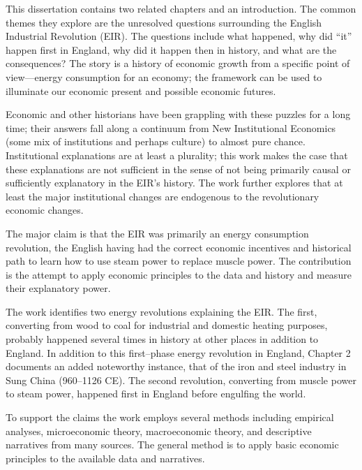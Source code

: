 
\setcounter{page}{3}


	This dissertation contains two related chapters and an introduction. The common themes they explore are the unresolved questions surrounding the English Industrial Revolution (EIR). The questions include what happened, why did ``it'' happen first in England, why did it happen then in history, and what are the consequences? The story is a history of economic growth from a specific point of view---energy consumption for an economy; the framework can be used to illuminate our economic present and possible economic futures.

	Economic and other historians have been grappling with these puzzles for a long time; their answers fall along a continuum from New Institutional Economics (some mix of institutions and perhaps culture) to almost pure chance. Institutional explanations are at least a plurality; this work makes the case that these explanations are not sufficient in the sense of not being primarily causal or sufficiently explanatory in the EIR's history. The work further explores that at least the major institutional changes are endogenous to the revolutionary economic changes.

	The major claim is that the EIR was primarily an energy consumption revolution, the English having had the correct economic incentives and historical path to learn how to use steam power to replace muscle power. The contribution is the attempt to apply economic principles to the data and history and measure their explanatory power.

	The work identifies two energy revolutions explaining the EIR. The first, converting from wood to coal for industrial and domestic heating purposes, probably happened several times in history at other places in addition to England. In addition to this first--phase energy revolution in England, Chapter 2 documents an added noteworthy instance, that of the iron and steel industry in Sung China (960--1126 CE). The second revolution, converting from muscle power to steam power, happened first in England before engulfing the world.

	To support the claims the work employs several methods including empirical analyses, microeconomic theory, macroeconomic theory, and descriptive narratives from many sources. The general method is to apply basic economic principles to the available data and narratives.

